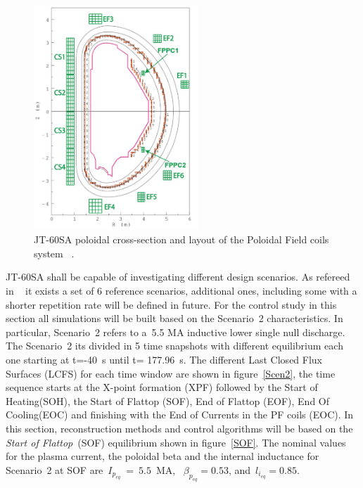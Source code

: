 \begin{figure}
	\centering
	\includegraphics[width=0.55\textwidth]{Chp3/JT60Coils.png}

	\caption{	\label{JT60coils}JT-60SA poloidal cross-section and layout of the Poloidal Field coils system ~\cite{NCruz}.}
\end{figure}

JT-60SA shall be capable of investigating different design scenarios. As refereed  in 
~\cite{JT60SA:PID} it exists a set of 6 reference scenarios, additional ones, including some with a shorter repetition rate will be defined in future. For the control study in this section all simulations will be built based on the Scenario~2 characteristics. In particular, Scenario~2 refers to a~5.5 MA inductive lower single null discharge. The Scenario~2 its divided in 5 time snapshots with different equilibrium each one starting at  t=-40~s until t= 177.96~s. The different Last Closed Flux Surfaces (LCFS) for each time window are shown in figure~\ref{Scen2}, the time sequence starts at the X-point formation (XPF)	followed by the Start of Heating(SOH), the Start of Flattop (SOF), End of Flattop (EOF), End Of Cooling(EOC) and finishing with the End of Currents in the PF coils (EOC). In this section, reconstruction methods and control algorithms will be based on the \emph{Start of Flattop}~(SOF) equilibrium shown in figure~\ref{SOF}. The nominal values for the plasma current, the poloidal beta and the internal inductance for Scenario~2 at SOF are~$I_{p_{eq}}~=~5.5$~MA,~ $\beta_{p_{eq}}=0.53$, and~$l_{i_{eq}}=0.85$.\smallskip

